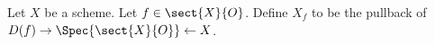 \begin{definition}
Let $X$ be a scheme.
Let $f\in \sect{X}{O}$.
Define $X_f$ to be the pullback of $D(f) \rightarrow \Spec{\sect{X}{O}} \leftarrow X$.
\end{definition}